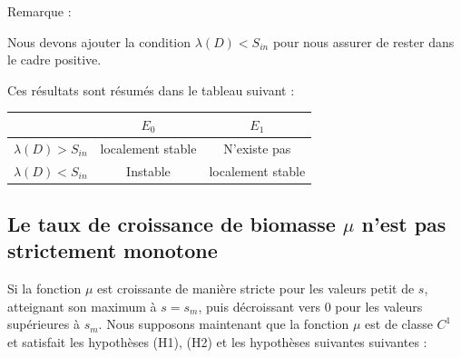 \documentclass[12pt,a4paper]{report}%
\newcounter{remm}[chapter]
\newenvironment{remarque}[2][]
  {\refstepcounter{remm}
  \begin{bclogo}[
    couleur=white,
    arrondi=0.1,
    couleurBord=white,#1]{Remarque \theremm:#2}
  }
  {\end{bclogo}}
\begin{document}
\begin{remarque}{}
 Nous devons ajouter la condition $\lambda(D)< S_{in}$  pour nous assurer de rester dans le cadre positive.
\end{remarque}
Ces résultats sont résumés dans le tableau suivant :

\begin{center}
    \begin{tabular}{|c|c|c|}
        \hline
        \rowcolor{lightgray}
        & $E_0$ & $E_1$ \\
        \hline \hline
        $\lambda(D) > S_{in}$ & localement stable & N'existe pas \\
        \hline
        $\lambda(D) < S_{in}$ & Instable & localement stable \\
        \hline
    \end{tabular}
\label{tab1}
\end{center}


\subsection{Le taux de croissance de biomasse $\mu$ n'est pas strictement monotone}
Si la fonction \( \mu \) est croissante de manière stricte pour les valeurs petit de \( s \), atteignant son maximum à \( s= s_{m} \), puis décroissant vers $0$ pour les valeurs supérieures à \( s_m \). Nous supposons maintenant que la fonction \( \mu \) est de classe \( C^1 \) et satisfait les hypothèses (H1), (H2) et les hypothèses suivantes  suivantes :\\
\end{document}
